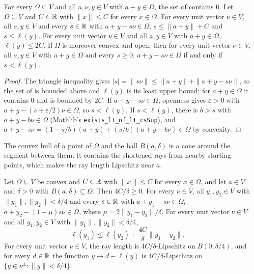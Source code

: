 \begin{lemma}
\label{lem:ray-length}
\leanok
{}
For every $\Omega \subseteq V$ and all $a, \nu, y \in V$ with $a + y \in \Omega$, the set of
 contains $0$. Let $\Omega \subseteq V$ and $C \in \mathbb{R}$ with $\|x\| \leq C$ for
every $x \in \Omega$. For every unit vector $\nu \in V$, all $a, y \in V$ and every $s \in \mathbb{R}$ with
$a + y - s\nu \in \Omega$, $s \leq \|a + y\| + C$ and $s \leq \ell(y)$. For every unit vector
$\nu \in V$ and all $a, y \in V$ with $a + y \in \Omega$, $\ell(y) \leq 2C$. If $\Omega$ is
moreover convex and open, then for every unit vector $\nu \in V$, all $a, y \in V$ with
$a + y \in \Omega$ and every $s \geq 0$, $a + y - s\nu \in \Omega$ if and only if $s < \ell(y)$.
\end{lemma}

\begin{proof}
\leanok
The triangle inequality gives $|s| = \|s\nu\| \leq \|a + y\| + \|a + y - s\nu\|$, so the set of
 is bounded above and $\ell(y)$ is its least upper bound; for
$a + y \in \Omega$ it contains $0$ and is bounded by $2C$. If $a + y - s\nu \in \Omega$, openness
gives $\varepsilon > 0$ with $a + y - (s + \varepsilon/2)\nu \in \Omega$, so $s < \ell(y)$. If
$s < \ell(y)$, there is $b > s$ with $a + y - b\nu \in \Omega$ (Mathlib's
\texttt{exists\_\allowbreak lt\_\allowbreak of\_\allowbreak lt\_\allowbreak csSup}), and
$a + y - s\nu = (1 - s/b)(a + y) + (s/b)(a + y - b\nu) \in \Omega$ by convexity.
\end{proof}

The convex hull of a point of $\Omega$ and the ball $B(a, \delta)$ is a cone around the segment
between them. It contains the shortened rays from nearby starting points, which makes the ray
length Lipschitz near $a$.

\begin{lemma}
\label{lem:ray-length-lipschitz}
\leanok
{}
Let $\Omega \subseteq V$ be convex and $C \in \mathbb{R}$ with $\|x\| \leq C$ for every $x \in \Omega$, and
let $a \in V$ and $\delta > 0$ with $B(a, \delta) \subseteq \Omega$. Then $4C/\delta \geq 0$. For
every $\nu \in V$, all $y_1, y_2 \in V$ with $\|y_1\|, \|y_2\| < \delta/4$ and every $s \in \mathbb{R}$
with $a + y_1 - s\nu \in \Omega$, $a + y_2 - (1 - \mu) s \nu \in \Omega$, where
$\mu = 2\|y_1 - y_2\|/\delta$. For every unit vector $\nu \in V$ and all $y_1, y_2 \in V$ with
$\|y_1\|, \|y_2\| < \delta/4$,
\[
  \ell(y_1) \leq \ell(y_2) + \frac{4C}{\delta} \|y_1 - y_2\| .
\]
For every unit vector $\nu \in V$, the ray length is $4C/\delta$-Lipschitz on $B(0, \delta/4)$,
and for every $d \in \mathbb{R}$ the function $y \mapsto d - \ell(y)$ is $4C/\delta$-Lipschitz on
$\{y \in \nu^\perp : \|y\| < \delta/4\}$.
\end{lemma}

